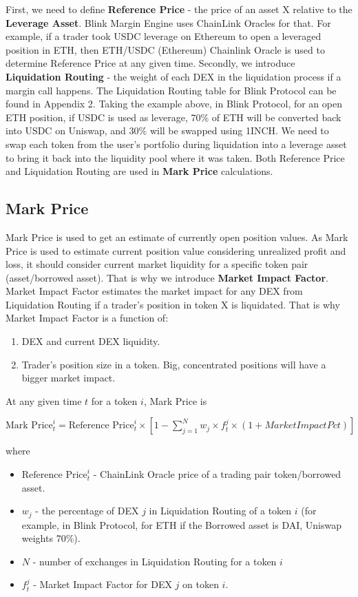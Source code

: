 \documentclass[letterpaper, 12pt]{article}
\begin{document}
First, we need to define \textbf {Reference Price} - the price of an asset X relative to the \textbf{Leverage Asset}. Blink Margin Engine uses ChainLink Oracles for that. For example, if a trader took USDC leverage on Ethereum to open a leveraged position in ETH, then ETH/USDC (Ethereum) Chainlink Oracle is used to determine Reference Price at any given time. Secondly, we introduce \textbf {Liquidation Routing} - the weight of each DEX in the liquidation process if a margin call happens. The Liquidation Routing table for Blink Protocol can be found in Appendix 2. Taking the example above, in Blink Protocol, for an open ETH position, if USDC is used as leverage, 70\% of ETH will be converted back into USDC on Uniswap, and 30\% will be swapped using 1INCH. We need to swap each token from the user's portfolio during liquidation into a leverage asset to bring it back into the liquidity pool where it was taken. Both Reference Price and Liquidation Routing are used in \textbf{Mark Price} calculations.

\subsection{Mark Price}

Mark Price is used to get an estimate of currently open position values. As Mark Price is used to estimate current position value considering unrealized profit and loss, it should consider current market liquidity for a specific token pair (asset/borrowed asset). That is why we introduce \textbf{Market Impact Factor}. Market Impact Factor estimates the market impact for any DEX from Liquidation Routing if a trader's position in token X is liquidated. That is why Market Impact Factor is a function of:
  \begin{enumerate}
  \item DEX and current DEX liquidity.
  \item Trader's position size in a token. Big, concentrated positions will have a bigger market impact. 	
  \end{enumerate}

At any given time $t$ for a token $i$, Mark Price is \begin{center} $\text{Mark Price}^{i}_{t}=\text{Reference Price}^{i}_{t}\times[1-\sum_{j=1}^{N}  w_{j}\times f_{t}^{j}\times(1+MarketImpactPct)]$ \end{center}
where

\begin{itemize}
\item $\text{Reference Price}^{i}_{t}$ - ChainLink Oracle price of a trading pair token/borrowed asset.
\item $w_{j}$ - the percentage of DEX $j$ in Liquidation Routing of a token $i$ (for example, in Blink Protocol, for ETH if the Borrowed asset is DAI,  Uniswap weights 70\%).
\item $N$ - number of exchanges in Liquidation Routing for a token $i$ 
\item $f_{t}^{j}$ - Market Impact Factor for DEX $j$ on token $i$.
	
\end{itemize}
\end{document}
